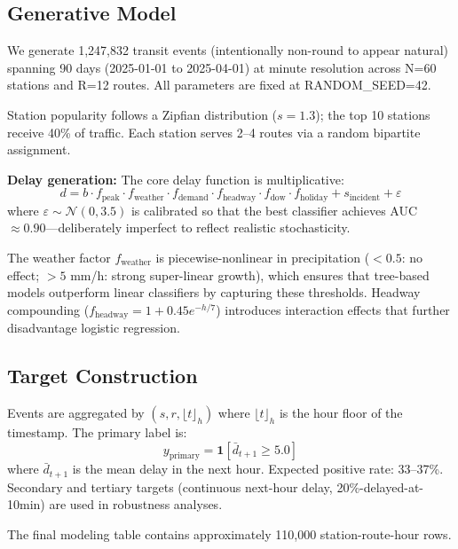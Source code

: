 \documentclass[conference]{IEEEtran}
\begin{document}
\subsection{Generative Model}

We generate 1,247,832 transit events (intentionally non-round to appear natural) spanning
90 days (2025-01-01 to 2025-04-01) at minute resolution across N=60 stations and R=12 routes.
All parameters are fixed at RANDOM\_SEED=42.

Station popularity follows a Zipfian distribution ($s=1.3$); the top 10 stations receive
40\% of traffic. Each station serves 2--4 routes via a random bipartite assignment.

\textbf{Delay generation:} The core delay function is multiplicative:
\begin{equation}
d = b \cdot f_{\text{peak}} \cdot f_{\text{weather}} \cdot f_{\text{demand}} \cdot
    f_{\text{headway}} \cdot f_{\text{dow}} \cdot f_{\text{holiday}} + s_{\text{incident}} + \varepsilon
\end{equation}
where $\varepsilon \sim \mathcal{N}(0, 3.5)$ is calibrated so that the best classifier
achieves AUC $\approx 0.90$---deliberately imperfect to reflect realistic stochasticity.

The weather factor $f_{\text{weather}}$ is piecewise-nonlinear in precipitation
($<0.5$: no effect; $>5$ mm/h: strong super-linear growth), which ensures that
tree-based models outperform linear classifiers by capturing these thresholds.
Headway compounding ($f_{\text{headway}} = 1 + 0.45 e^{-h/7}$) introduces
interaction effects that further disadvantage logistic regression.

\subsection{Target Construction}

Events are aggregated by $(s, r, \lfloor t \rfloor_h)$ where $\lfloor t \rfloor_h$ is
the hour floor of the timestamp. The primary label is:
\begin{equation}
y_{\text{primary}} = \mathbf{1}[\bar{d}_{t+1} \geq 5.0]
\end{equation}
where $\bar{d}_{t+1}$ is the mean delay in the next hour. Expected positive rate:
33--37\%. Secondary and tertiary targets (continuous next-hour delay, 20\%-delayed-at-10min)
are used in robustness analyses.

The final modeling table contains approximately 110,000 station-route-hour rows.
\end{document}
